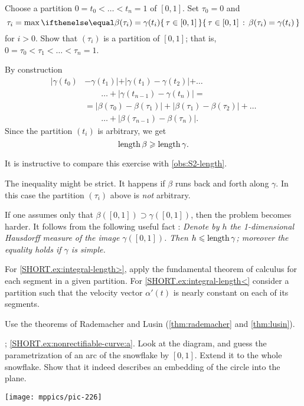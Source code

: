\begin{multicols}{2}
Choose a partition $0=t_0<\dots <t_n=1$ of $[0,1]$.
Set $\tau_0=0$ and 
\[\tau_i=\max\set{\tau \in[0,1]}{\beta(\tau_i)=\gamma(t_i)}\]
for $i>0$.
Show that $(\tau_i)$ is a partition of $[0,1]$;
that is, $0=\tau_0<\tau_1<\dots<\tau_n=1$.

By construction 
\begin{align*}
|\gamma(t_0)&-\gamma(t_1)|+|\gamma(t_1)-\gamma(t_2)|+\dots
\\
&\qquad\dots+|\gamma(t_{n-1})-\gamma(t_n)|=
\\
&=
|\beta(\tau_0)-\beta(\tau_1)|+|\beta(\tau_1)-\beta(\tau_2)|+\dots
\\
&\qquad\dots+|\beta(\tau_{n-1})-\beta(\tau_n)|.
\end{align*}
Since the partition $(t_i)$ is arbitrary, we get 
\[\mathop{\rm length}\nolimits \beta\geqslant \mathop{\rm length}\nolimits \gamma.\]

It is instructive to compare this exercise with \ref{obs:S2-length}.

The inequality might be strict.
It happens if $\beta$ runs back and forth along $\gamma$.
In this case the partition $(\tau_i)$ above is \textit{not} arbitrary.

If one assumes only that $\beta([0,1])\supset\gamma([0,1])$, then the problem becomes harder.
It follows from the following useful fact \cite[2.6.1+2.6.2]{burago-burago-ivanov}:
\textit{Denote by $h$ the 1-dimensional Hausdorff measure of the image $\gamma([0,1])$.
Then $h\leqslant \mathop{\rm length}\nolimits\gamma$;
moreover the equality holds if $\gamma$ is simple.}

For \ref{SHORT.ex:integral-length>}, apply the fundamental theorem of calculus for each segment in a given partition.
For \ref{SHORT.ex:integral-length<} consider a partition such that the velocity vector $\alpha'(t)$ is nearly constant on each of its segments.

Use the theorems of Rademacher and Lusin (\ref{thm:rademacher} and \ref{thm:lusin}).

\parbf{\ref{ex:nonrectifiable-curve}}; \ref{SHORT.ex:nonrectifiable-curve:a}.
Look at the diagram, and guess the parametrization of an arc of the snowflake by $[0,1]$.
Extend it to the whole snowflake.
Show that it indeed describes an embedding of the circle into the plane.

\begin{Figure}
\vskip-0mm
\centering
\texttt{[image: mppics/pic-226]}
\vskip0mm
\end{Figure}


\end{multicols}
